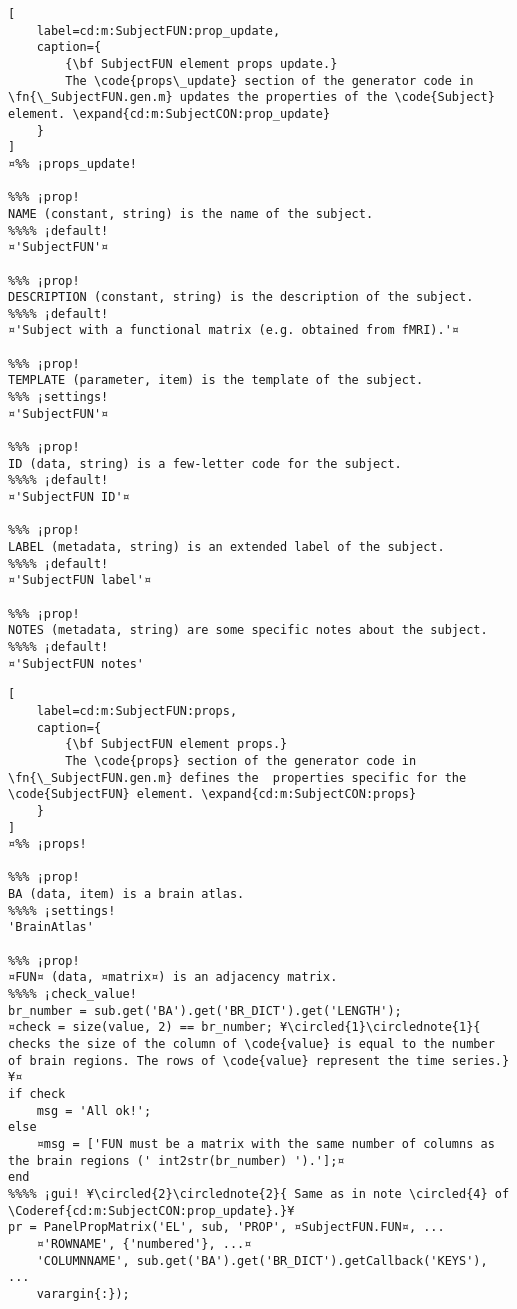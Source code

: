 \documentclass{tufte-handout}
\begin{document}
\begin{lstlisting}[
	label=cd:m:SubjectFUN:prop_update,
	caption={
		{\bf SubjectFUN element props update.}
		The \code{props\_update} section of the generator code in \fn{\_SubjectFUN.gen.m} updates the properties of the \code{Subject} element. \expand{cd:m:SubjectCON:prop_update}
	}
]
¤%% ¡props_update!

%%% ¡prop!
NAME (constant, string) is the name of the subject.
%%%% ¡default!
¤'SubjectFUN'¤

%%% ¡prop!
DESCRIPTION (constant, string) is the description of the subject.
%%%% ¡default!
¤'Subject with a functional matrix (e.g. obtained from fMRI).'¤

%%% ¡prop!
TEMPLATE (parameter, item) is the template of the subject.
%%% ¡settings!
¤'SubjectFUN'¤

%%% ¡prop!
ID (data, string) is a few-letter code for the subject.
%%%% ¡default!
¤'SubjectFUN ID'¤

%%% ¡prop!
LABEL (metadata, string) is an extended label of the subject.
%%%% ¡default!
¤'SubjectFUN label'¤

%%% ¡prop!
NOTES (metadata, string) are some specific notes about the subject.
%%%% ¡default!
¤'SubjectFUN notes'
\end{lstlisting}

\begin{lstlisting}[
	label=cd:m:SubjectFUN:props,
	caption={
		{\bf SubjectFUN element props.}
		The \code{props} section of the generator code in \fn{\_SubjectFUN.gen.m} defines the  properties specific for the \code{SubjectFUN} element. \expand{cd:m:SubjectCON:props}
	}
]
¤%% ¡props!

%%% ¡prop!
BA (data, item) is a brain atlas.
%%%% ¡settings!
'BrainAtlas'

%%% ¡prop!
¤FUN¤ (data, ¤matrix¤) is an adjacency matrix.
%%%% ¡check_value!
br_number = sub.get('BA').get('BR_DICT').get('LENGTH');
¤check = size(value, 2) == br_number; ¥\circled{1}\circlednote{1}{ checks the size of the column of \code{value} is equal to the number of brain regions. The rows of \code{value} represent the time series.}¥¤
if check
    msg = 'All ok!';
else   
    ¤msg = ['FUN must be a matrix with the same number of columns as the brain regions (' int2str(br_number) ').'];¤
end
%%%% ¡gui! ¥\circled{2}\circlednote{2}{ Same as in note \circled{4} of \Coderef{cd:m:SubjectCON:prop_update}.}¥
pr = PanelPropMatrix('EL', sub, 'PROP', ¤SubjectFUN.FUN¤, ...
    ¤'ROWNAME', {'numbered'}, ...¤
    'COLUMNNAME', sub.get('BA').get('BR_DICT').getCallback('KEYS'), ...
    varargin{:});
\end{lstlisting}
\end{document}

